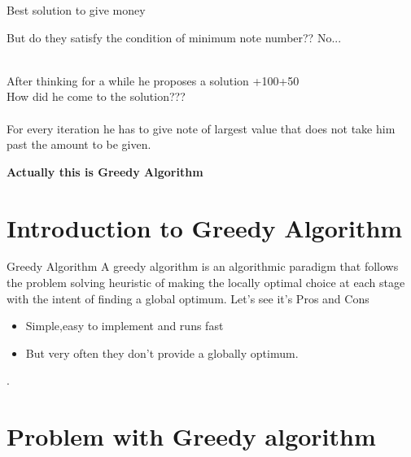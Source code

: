 \documentclass{beamer}
\begin{document}
\begin{frame}{Best solution to give money}

But do they satisfy the condition of minimum note number?? \newline No...\\ \\ \pause
\newline

After thinking for a while he proposes a solution 
+100+50\\ \pause
\newline  How did he come to the solution???\\ \\ \pause
\newline
For every iteration he has to give note of largest value that does not take him past the amount to be given.\pause
\newline  


\textbf{Actually  this  is  Greedy Algorithm}
\end{frame}





\section{Introduction to Greedy Algorithm}

\begin{frame}{Greedy Algorithm}
A greedy algorithm is an algorithmic paradigm that follows the problem solving heuristic of making the locally optimal choice at each stage with the intent of finding a global optimum. 
\newline Let's see it's Pros and Cons \newline \pause
\newline 
\begin{itemize}
        \item Simple,easy to implement and runs fast\pause
        \item  But very often they don't provide a globally optimum.
    \end{itemize} 
\newline .
 


\end{frame}



\section{Problem with Greedy algorithm}
\end{document}
